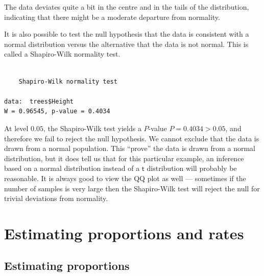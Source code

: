 \documentclass[
  a4paper,
  DIV=11,
  numbers=noendperiod,
  oneside]{scrreprt}
\newenvironment{Shaded}{\begin{snugshade}}{\end{snugshade}}
\newcommand{\FunctionTok}[1]{\textcolor[rgb]{0.28,0.35,0.67}{#1}}
\newcommand{\NormalTok}[1]{\textcolor[rgb]{0.00,0.23,0.31}{#1}}
\newcommand{\SpecialCharTok}[1]{\textcolor[rgb]{0.37,0.37,0.37}{#1}}
\theoremstyle{plain}
\theoremstyle{definition}
\theoremstyle{definition}
\theoremstyle{definition}
\theoremstyle{plain}
\theoremstyle{remark}
\begin{document}
\begin{tcolorbox}
\begin{figure}[H]
\end{figure}%

The data deviates quite a bit in the centre and in the tails of the
distribution, indicating that there might be a moderate departure from
normality.

It is also possible to test the null hypothesis that the data is
consistent with a normal distribution versus the alternative that the
data is not normal. This is called a Shapiro-Wilk normality test.

\begin{Shaded}
\end{Shaded}

\begin{verbatim}

    Shapiro-Wilk normality test

data:  trees$Height
W = 0.96545, p-value = 0.4034
\end{verbatim}

At level \(0.05\), the Shapiro-Wilk test yields a \(P\)-value
\(P = 0.4034 > 0.05\), and therefore we fail to reject the null
hypothesis. We cannot exclude that the data is drawn from a normal
population. This ``prove'' the data is drawn from a normal distribution,
but it does tell us that for this particular example, an inference based
on a normal distribution instead of a \(\mathsf{t}\) distribution will
probably be reasonable. It is always good to view the QQ plot as well
--- sometimes if the number of samples is very large then the
Shapiro-Wilk test will reject the null for trivial deviations from
normality.

\end{tcolorbox}

\section{Estimating proportions and
rates}\label{sec-estimating-proportions-rates}

\subsection{Estimating proportions}\label{sec-estimating-proportions}
\end{document}
